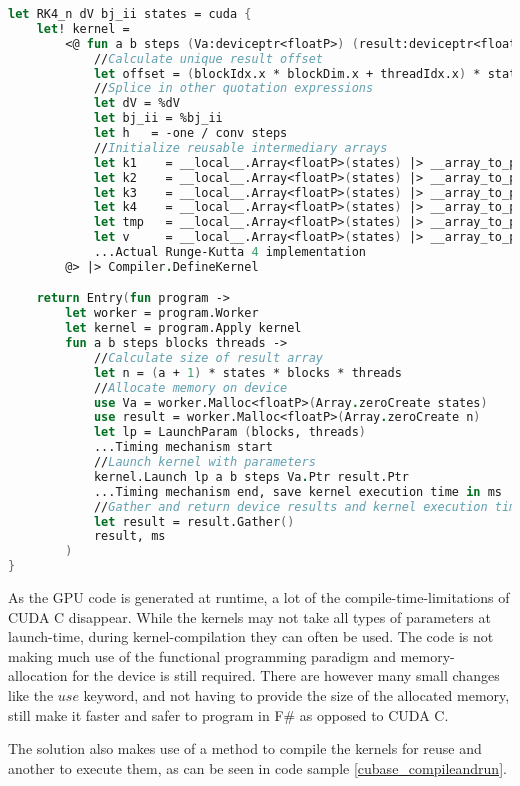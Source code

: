 \begin{lstlisting}[language=FSharp, caption=The Runge-Kutta 4 solver expressed in F\# Alea.cuBase, label=cubase_rk4_n_snippet]
let RK4_n dV bj_ii states = cuda {
	let! kernel =
		<@ fun a b steps (Va:deviceptr<floatP>) (result:deviceptr<floatP>) ->
			//Calculate unique result offset
			let offset = (blockIdx.x * blockDim.x + threadIdx.x) * states * (a + 1)
            //Splice in other quotation expressions
			let dV = %dV
			let bj_ii = %bj_ii
			let h   = -one / conv steps
			//Initialize reusable intermediary arrays
			let k1	  = __local__.Array<floatP>(states) |> __array_to_ptr
			let k2	  = __local__.Array<floatP>(states) |> __array_to_ptr
			let k3	  = __local__.Array<floatP>(states) |> __array_to_ptr
			let k4	  = __local__.Array<floatP>(states) |> __array_to_ptr
			let tmp	  = __local__.Array<floatP>(states) |> __array_to_ptr
			let v	  = __local__.Array<floatP>(states) |> __array_to_ptr
            ...Actual Runge-Kutta 4 implementation
        @> |> Compiler.DefineKernel 

    return Entry(fun program ->
        let worker = program.Worker
        let kernel = program.Apply kernel
        fun a b steps blocks threads ->
            //Calculate size of result array
            let n = (a + 1) * states * blocks * threads
            //Allocate memory on device
            use Va = worker.Malloc<floatP>(Array.zeroCreate states)
            use result = worker.Malloc<floatP>(Array.zeroCreate n)
            let lp = LaunchParam (blocks, threads)
            ...Timing mechanism start
            //Launch kernel with parameters
            kernel.Launch lp a b steps Va.Ptr result.Ptr
            ...Timing mechanism end, save kernel execution time in ms
            //Gather and return device results and kernel execution time
            let result = result.Gather()
            result, ms
        )
}
\end{lstlisting}

As the GPU code is generated at runtime, a lot of the compile-time-limitations of CUDA C disappear.
While the kernels may not take all types of parameters at launch-time, during kernel-compilation they can often be used.
The code is not making much use of the functional programming paradigm and memory-allocation for the device is still required.
There are however many small changes like the $use$ keyword, and not having to provide the size of the allocated memory, still make it faster and safer to program in F\# as opposed to CUDA C.

The solution also makes use of a method to compile the kernels for reuse and another to execute them, as can be seen in code sample \ref{cubase_compileandrun}. 

